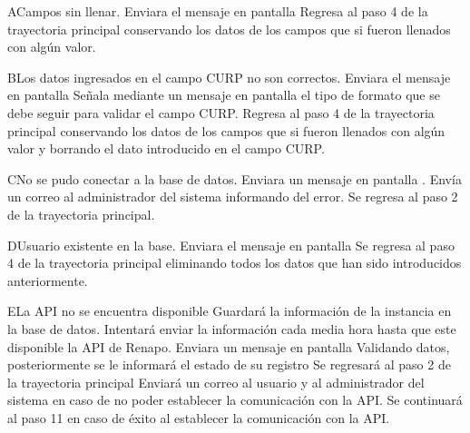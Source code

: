 		\begin{UCtrayectoriaA}{A}{Campos sin llenar.}
			\UCpaso[\UCsist] Enviara el  mensaje en pantalla 
			\UCpaso[\UCsist] Regresa al paso 4 de la trayectoria principal conservando los datos de los campos que si fueron llenados con algún valor.
		\end{UCtrayectoriaA}
		
		
		\begin{UCtrayectoriaA}{B}{Los datos ingresados en el campo CURP no son correctos.}
			\UCpaso[\UCsist] Enviara el mensaje en pantalla 
			\UCpaso[\UCsist] Señala mediante un mensaje en pantalla el tipo de formato que se debe seguir para validar el campo CURP.
			\UCpaso[\UCsist] Regresa al paso 4 de la trayectoria principal conservando los datos de los campos que si fueron llenados con algún valor y borrando el dato introducido en el campo CURP.		
		\end{UCtrayectoriaA}	
		
		
		\begin{UCtrayectoriaA}{C}{No se pudo conectar a la base de datos.}
			\UCpaso[\UCsist] Enviara un mensaje en pantalla   .
			\UCpaso[\UCsist] Envía un correo al administrador del sistema informando del error.
			\UCpaso[\UCsist] Se regresa al paso 2 de la trayectoria principal.
		\end{UCtrayectoriaA}		
		
		
		
		\begin{UCtrayectoriaA}{D}{Usuario existente en la base.}
			\UCpaso[\UCsist] Enviara el mensaje en pantalla  
			\UCpaso[\UCsist] Se regresa al paso 4 de la trayectoria principal eliminando todos los datos que han sido introducidos anteriormente.
		\end{UCtrayectoriaA}
		
		
		\begin{UCtrayectoriaA}{E}{La API no se encuentra disponible}
			\UCpaso[\UCsist] Guardará la información de la instancia en la base de datos.
			\UCpaso[\UCsist]Intentará enviar la información cada media hora hasta que este disponible la API de Renapo.
			\UCpaso[\UCsist] Enviara un mensaje en pantalla  {Validando datos, posteriormente se le informará el estado de su registro}
			\UCpaso[\UCsist] Se regresará al paso 2 de la trayectoria principal
			\UCpaso[\UCsist]  Enviará un correo al usuario y al administrador del sistema en caso de no poder establecer la comunicación con la API.
			\UCpaso[\UCsist] Se continuará al paso 11 en caso de éxito al establecer la comunicación con la API.
		\end{UCtrayectoriaA}
		
